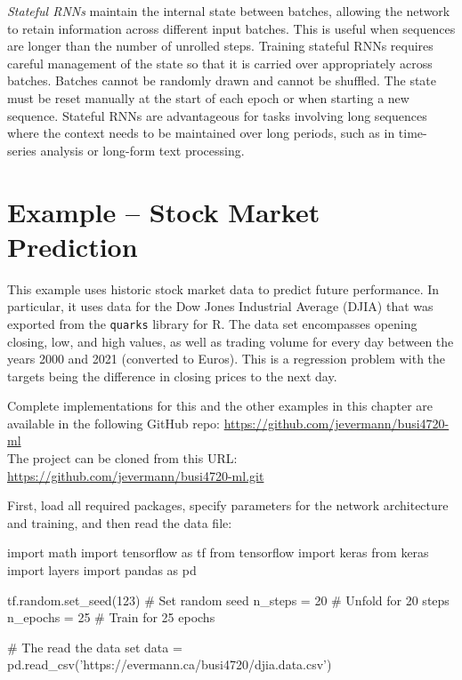 \emph{Stateful RNNs} maintain the internal state between batches, allowing the network to retain information across different input batches. This is useful when sequences are longer than the number of unrolled steps. Training stateful RNNs requires careful management of the state so that it is carried over appropriately across batches. Batches cannot be randomly drawn and cannot be shuffled. The state must be reset manually at the start of each epoch or when starting a new sequence. Stateful RNNs are advantageous for tasks involving long sequences where the context needs to be maintained over long periods, such as in time-series analysis or long-form text processing.

\section{Example -- Stock Market Prediction}

This example uses historic stock market data to predict future performance. In particular, it uses data for the Dow Jones Industrial Average (DJIA) that was exported from the \texttt{quarks} library for R. The data set encompasses opening closing, low, and high values, as well as trading volume for every day between the years 2000 and 2021 (converted to Euros). This is a regression problem with the targets being the difference in closing prices to the next day.

\begin{tcolorbox}[colback=code]
\footnotesize
Complete implementations for this and the other examples in this chapter are available in the following GitHub repo:
\url{https://github.com/jevermann/busi4720-ml} \\

The project can be cloned from this URL: \url{https://github.com/jevermann/busi4720-ml.git}
\normalsize
\end{tcolorbox}

First, load all required packages, specify parameters for the network architecture and training, and then read the data file:

\begin{samepage}
\begin{pythoncode}
import math
import tensorflow as tf
from tensorflow import keras
from keras import layers
import pandas as pd

tf.random.set_seed(123)   # Set random seed
n_steps = 20              # Unfold for 20 steps
n_epochs = 25             # Train for 25 epochs

# The read the data set
data = pd.read_csv('https://evermann.ca/busi4720/djia.data.csv')
\end{pythoncode}
\end{samepage}

